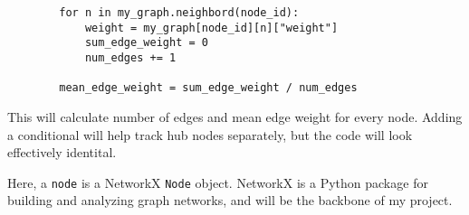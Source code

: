 \documentclass[titlepage, 12pt, leqno]{article}
\begin{document}
\begin{enumerate}
\begin{verbatim}
        for n in my_graph.neighbord(node_id):
            weight = my_graph[node_id][n]["weight"]
            sum_edge_weight = 0
            num_edges += 1

        mean_edge_weight = sum_edge_weight / num_edges
        \end{verbatim}

        This will calculate number of edges and mean edge weight for every node.
        Adding a conditional will help track hub nodes separately, but the code 
        will look effectively identital. 

        \begin{note}
            Here, a \texttt{node} is a NetworkX \texttt{Node} object. NetworkX is
            a Python package for building and analyzing graph networks, and will
            be the backbone of my project.
        \end{note}
\end{enumerate}
\end{document}
